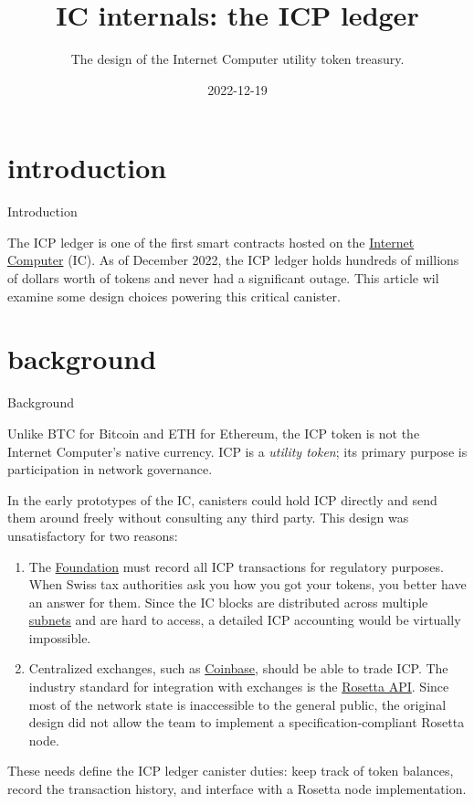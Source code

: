 \documentclass{article}
\title{IC internals: the ICP ledger}
\subtitle{The design of the Internet Computer utility token treasury.}
\date{2022-12-19}
\begin{document}
\section{introduction}{Introduction}

The ICP ledger is one of the first smart contracts hosted on the \href{https://internetcomputer.org}{Internet Computer} (IC).
As of December 2022, the ICP ledger holds hundreds of millions of dollars worth of tokens and never had a significant outage.
This article wil examine some design choices powering this critical canister.

\section{background}{Background}

Unlike BTC for Bitcoin and ETH for Ethereum, the ICP token is not the Internet Computer's native currency.
ICP is a \emph{utility token}; its primary purpose is participation in network governance.

In the early prototypes of the IC, canisters could hold ICP directly and send them around freely without consulting any third party.
This design was unsatisfactory for two reasons:
\begin{enumerate}
  \item
    The \href{https://dfinity.org/}{Foundation} must record all ICP transactions for regulatory purposes.
    When Swiss tax authorities ask you how you got your tokens, you better have an answer for them.
    Since the IC blocks are distributed across multiple \href{/posts/08-ic-xnet.html#subnets}{subnets} and are hard to access, a detailed ICP accounting would be virtually impossible.
  \item
    Centralized exchanges, such as \href{https://www.coinbase.com/}{Coinbase}, should be able to trade ICP.
    The industry standard for integration with exchanges is the \href{https://rosetta-api.org/}{Rosetta API}.
    Since most of the network state is inaccessible to the general public, the original design did not allow the team to implement a specification-compliant Rosetta node.
\end{enumerate}

These needs define the ICP ledger canister duties: keep track of token balances, record the transaction history, and interface with a Rosetta node implementation.
\end{document}
